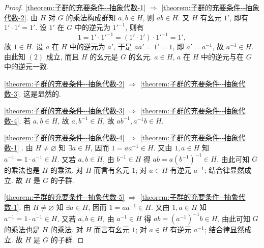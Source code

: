 \documentclass[../../main.tex]{subfiles}%
\begin{document}
\begin{proof}

\ref{theorem:子群的充要条件--抽象代数-1} $\Rightarrow$ \ref{theorem:子群的充要条件--抽象代数-2}. 由 \( H \) 对 \( G \) 的乘法构成群知 \( a, b \in H \), 则 \( ab \in H \). 又 \( H \) 有幺元 \( 1' \), 即有 \( 1' \cdot 1' = 1' \). 设 \( 1' \) 在 \( G \) 中的逆元为 \( 1'^{-1} \), 则有
\[
1 = 1' \cdot 1'^{-1} = (1' \cdot 1') \cdot 1'^{-1} = 1',
\]
故 \( 1 \in H \). 设 \( a \) 在 \( H \) 中的逆元为 \( a' \), 于是 \( aa' = 1' = 1 \), 即 \( a' = a^{-1} \), 故 \( a^{-1} \in H \). 由此知 \( (2) \) 成立, 而且 \( H \) 的幺元是 \( G \) 的幺元. \( a \in H \), \( a \) 在 \( H \) 中的逆元与在 \( G \) 中的逆元一致.

\ref{theorem:子群的充要条件--抽象代数-2} $\Rightarrow$ \ref{theorem:子群的充要条件--抽象代数-3}. 这是显然的.

\ref{theorem:子群的充要条件--抽象代数-3} $\Rightarrow$ \ref{theorem:子群的充要条件--抽象代数-4}. 若 \( a, b \in H \), 故 \( a, b^{-1} \in H \), 故 \( ab^{-1},a^{-1}b \in H \).

\ref{theorem:子群的充要条件--抽象代数-4} $\Rightarrow$ \ref{theorem:子群的充要条件--抽象代数-1} . 由 \( H \neq \varnothing \) 知 \( \exists a \in H \), 因而 \( 1 = aa^{-1} \in H \). 又由 \( 1, a \in H \) 知 \( a^{-1} = 1 \cdot a^{-1} \in H \). 又若 \( a, b \in H \), 由 \( b^{-1} \in H \) 得 \( ab = a(b^{-1})^{-1} \in H \). 由此可知 \( G \) 的乘法也是 \( H \) 的乘法. 对 \( H \) 而言有幺元 \( 1 \); 对 \( a \in H \) 有逆元 \( a^{-1} \); 结合律显然成立. 故 \( H \) 是 \( G \) 的子群.

\ref{theorem:子群的充要条件--抽象代数-5} $\Rightarrow$ \ref{theorem:子群的充要条件--抽象代数-1}. 由 \( H \neq \varnothing \) 知 \( \exists a \in H \), 因而 \( 1 = aa^{-1} \in H \). 又由 \( 1, a \in H \) 知 \( a^{-1} = 1 \cdot a^{-1} \in H \). 又若 \( a, b \in H \), 由 \( a^{-1} \in H \) 得 \( ab = (a^{-1})^{-1}b \in H \). 由此可知 \( G \) 的乘法也是 \( H \) 的乘法. 对 \( H \) 而言有幺元 \( 1 \); 对 \( a \in H \) 有逆元 \( a^{-1} \); 结合律显然成立. 故 \( H \) 是 \( G \) 的子群.

\end{proof}
\end{document}
